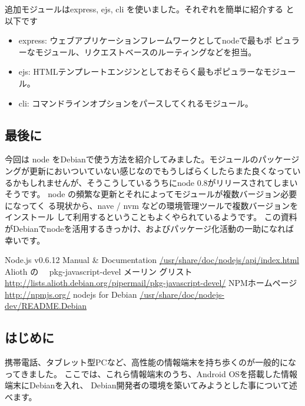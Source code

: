 \documentclass[mingoth,a4paper]{jsarticle}
\begin{document}
追加モジュールはexpress, ejs, cli を使いました。それぞれを簡単に紹介する
と以下です

\begin{itemize}
 \item express: ウェブアプリケーションフレームワークとしてnodeで最もポ
       ピュラーなモジュール、リクエストベースのルーティングなどを担当。
 \item ejs: HTMLテンプレートエンジンとしておそらく最もポピュラーなモジュール。
 \item cli: コマンドラインオプションをパースしてくれるモジュール。
\end{itemize}


\subsection{最後に}

今回は node をDebianで使う方法を紹介してみました。モジュールのパッケージ
ングが更新においついていない感じなのでもうしばらくしたらまた良くなってい
るかもしれませんが、そうこうしているうちにnode 0.8がリリースされてしまい
そうです。
node の頻繁な更新とそれによってモジュールが複数バージョン必要になってく
る現状から、nave / nvm などの環境管理ツールで複数バージョンをインストール
して利用するということもよくやられているようです。
この資料がDebianでnodeを活用するきっかけ、およびパッケージ化活動の一助になれば幸いです。

\begin{thebibliography}{0}
  Node.js v0.6.12 Manual \& Documentation
	\url{/usr/share/doc/nodejs/api/index.html}
 Alioth の 　pkg-javascript-devel メーリン
	グリスト
	\url{http://lists.alioth.debian.org/pipermail/pkg-javascript-devel/}
 NPMホームページ \url{http://npmjs.org/}
 nodejs for Debian \url{/usr/share/doc/nodejs-dev/README.Debian}
\end{thebibliography}

\subsection{はじめに} 
携帯電話、タブレット型PCなど、高性能の情報端末を持ち歩くのが一般的になってきました。
ここでは、これら情報端末のうち、Android OSを搭載した情報端末にDebianを入れ、
Debian開発者の環境を築いてみようとした事について述べます。
\end{document}
